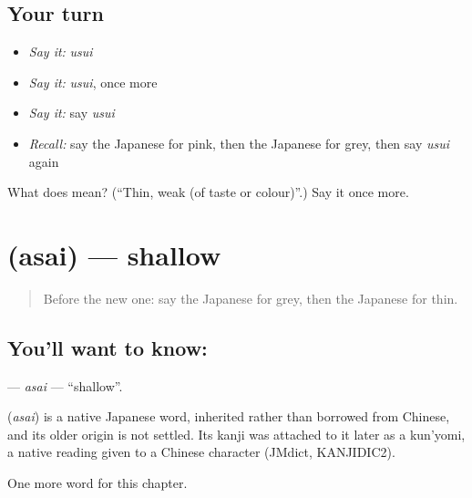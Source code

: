 \subsection*{Your turn}
\begin{itemize}
\raggedright
  \item \emph{Say it:} \emph{usui}
  \item \emph{Say it:} \emph{usui}, once more
  \item \emph{Say it:} say \emph{usui}
  \item \emph{Recall:} say the Japanese for pink, then the Japanese for grey, then say \emph{usui} again
\end{itemize}

\begin{tcolorbox}[breakable,colback=teal!4,colframe=teal!35!black,title={Before you move on}]
What does  mean? (\textquotedblleft{}Thin, weak (of taste or colour)\textquotedblright{}.) Say it once more.
\end{tcolorbox}
\section[\texorpdfstring{\ja{あさい} (asai)}{あさい (asai)}]{ (asai) — shallow}

\label{lesson:JA-C121-asai}



\begin{quote}
Before the new one: say the Japanese for grey, then the Japanese for thin.
\end{quote}

\subsection*{You'll want to know: }
\textbf{} — \emph{asai} — \textquotedblleft{}shallow\textquotedblright{}.

\begin{cousinweb}
\textbf{} (\emph{asai}) is a native Japanese word, inherited rather than borrowed from Chinese, and its older origin is not settled. Its kanji was attached to it later as a kun'yomi, a native reading given to a Chinese character (JMdict, KANJIDIC2).
\end{cousinweb}

\begin{grammarlens}[title={What you've built}]
One more word for this chapter.
\end{grammarlens}

